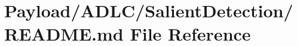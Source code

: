 \hypertarget{Payload_2ADLC_2SalientDetection_2README_8md}{\section{Payload/\-A\-D\-L\-C/\-Salient\-Detection/\-R\-E\-A\-D\-M\-E.md File Reference}
\label{Payload_2ADLC_2SalientDetection_2README_8md}
}
